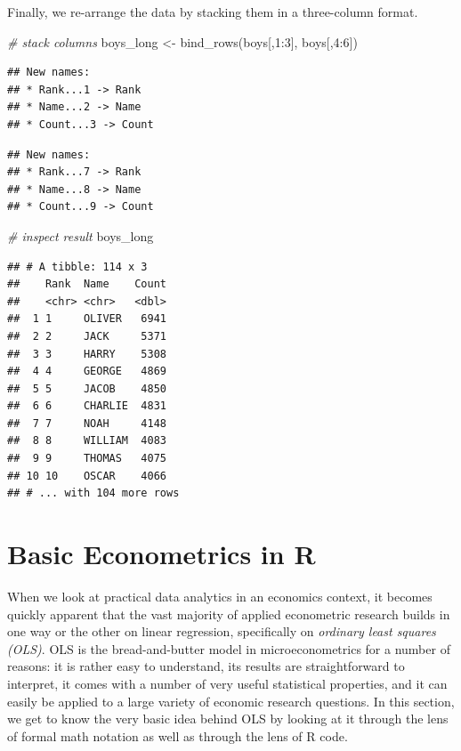 \documentclass[
  12pt,
]{style/krantz}
\newenvironment{Shaded}{\begin{snugshade}}{\end{snugshade}}
\newcommand{\CommentTok}[1]{\textcolor[rgb]{0.56,0.35,0.01}{\textit{#1}}}
\newcommand{\DecValTok}[1]{\textcolor[rgb]{0.00,0.00,0.81}{#1}}
\newcommand{\FunctionTok}[1]{\textcolor[rgb]{0.00,0.00,0.00}{#1}}
\newcommand{\NormalTok}[1]{#1}
\newcommand{\OtherTok}[1]{\textcolor[rgb]{0.56,0.35,0.01}{#1}}
\newcommand{\SpecialCharTok}[1]{\textcolor[rgb]{0.00,0.00,0.00}{#1}}
\begin{document}
Finally, we re-arrange the data by stacking them in a three-column format.

\begin{Shaded}
\begin{Highlighting}[]
\CommentTok{\# stack columns}
\NormalTok{boys\_long }\OtherTok{\textless{}{-}} \FunctionTok{bind\_rows}\NormalTok{(boys[,}\DecValTok{1}\SpecialCharTok{:}\DecValTok{3}\NormalTok{], boys[,}\DecValTok{4}\SpecialCharTok{:}\DecValTok{6}\NormalTok{])}
\end{Highlighting}
\end{Shaded}

\begin{verbatim}
## New names:
## * Rank...1 -> Rank
## * Name...2 -> Name
## * Count...3 -> Count
\end{verbatim}

\begin{verbatim}
## New names:
## * Rank...7 -> Rank
## * Name...8 -> Name
## * Count...9 -> Count
\end{verbatim}

\begin{Shaded}
\begin{Highlighting}[]
\CommentTok{\# inspect result}
\NormalTok{boys\_long}
\end{Highlighting}
\end{Shaded}

\begin{verbatim}
## # A tibble: 114 x 3
##    Rank  Name    Count
##    <chr> <chr>   <dbl>
##  1 1     OLIVER   6941
##  2 2     JACK     5371
##  3 3     HARRY    5308
##  4 4     GEORGE   4869
##  5 5     JACOB    4850
##  6 6     CHARLIE  4831
##  7 7     NOAH     4148
##  8 8     WILLIAM  4083
##  9 9     THOMAS   4075
## 10 10    OSCAR    4066
## # ... with 104 more rows
\end{verbatim}

\hypertarget{basic-econometrics-in-r}{%
\chapter{Basic Econometrics in R}\label{basic-econometrics-in-r}}

When we look at practical data analytics in an economics context, it becomes quickly apparent that the vast majority of applied econometric research builds in one way or the other on linear regression, specifically on \emph{ordinary least squares (OLS)}. OLS is the bread-and-butter model in microeconometrics for a number of reasons: it is rather easy to understand, its results are straightforward to interpret, it comes with a number of very useful statistical properties, and it can easily be applied to a large variety of economic research questions. In this section, we get to know the very basic idea behind OLS by looking at it through the lens of formal math notation as well as through the lens of R code.
\end{document}
